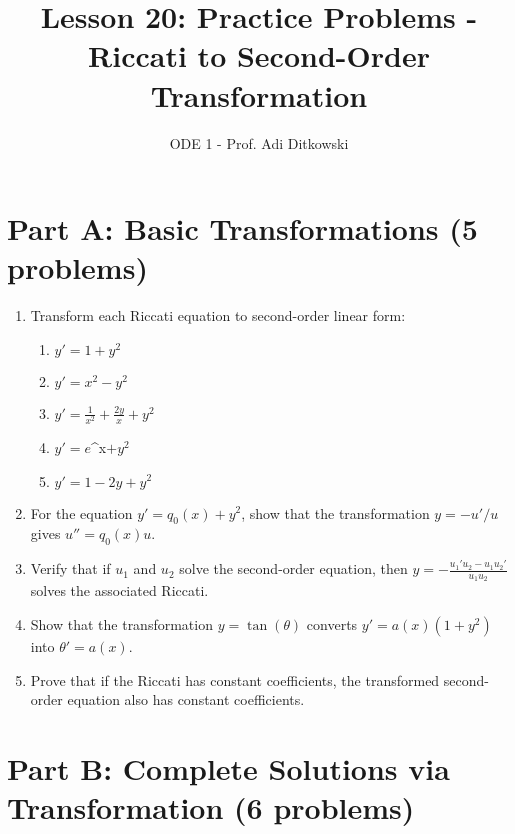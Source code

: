 \documentclass[12pt]{article}
\title{Lesson 20: Practice Problems - Riccati to Second-Order Transformation}
\author{ODE 1 - Prof. Adi Ditkowski}
\date{}
\begin{document}
\maketitle

\section*{Part A: Basic Transformations (5 problems)}

\begin{enumerate}
    \item Transform each Riccati equation to second-order linear form:
    \begin{enumerate}[label=(\alph*)]
        \item $y' = 1 + y^{2}$
        \item $y' = x^{2} - y^{2}$
        \item $y' = \frac{1}{x^{2}} + \frac{2y}{x} + y^{2}$
        \item $y' = e$^{x}$ + y^{2}$
        \item $y' = 1 - 2y + y^{2}$
    \end{enumerate}

    \item For the equation $y' = q_{0}(x) + y^{2}$, show that the transformation $y = -u'/u$ gives $u'' = q_{0}(x)u$.

    \item Verify that if $u_{1}$ and $u_{2}$ solve the second-order equation, then $y = -\frac{u_{1}' u_{2} - u_{1} u_{2}'}{u_{1} u_{2}}$ solves the associated Riccati.

    \item Show that the transformation $y = \tan(\theta)$ converts $y' = a(x)(1 + y^{2})$ into $\theta' = a(x)$.

    \item Prove that if the Riccati has constant coefficients, the transformed second-order equation also has constant coefficients.
\end{enumerate}

\section*{Part B: Complete Solutions via Transformation (6 problems)}
\end{document}
